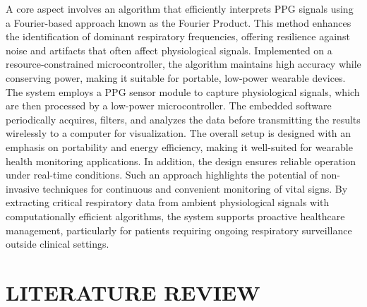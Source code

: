 \documentclass[12pt,a4paper]{report}
\begin{document}
 A core aspect involves an algorithm that efficiently interprets PPG signals using a Fourier-based approach known as the Fourier Product. This method enhances the identification of dominant respiratory frequencies, offering resilience against noise and artifacts that often affect physiological signals. Implemented on a resource-constrained microcontroller, the algorithm maintains high accuracy while conserving power, making it suitable for portable, low-power wearable devices.\\

 The system employs a PPG sensor module to capture physiological signals, which are then processed by a low-power microcontroller. The embedded software periodically acquires, filters, and analyzes the data before transmitting the results wirelessly to a computer for visualization. The overall setup is designed with an emphasis on portability and energy efficiency, making it well-suited for wearable health monitoring applications. In addition, the design ensures reliable operation under real-time conditions. Such an approach highlights the potential of non-invasive techniques for continuous and convenient monitoring of vital signs. By extracting critical respiratory data from ambient physiological signals with computationally efficient algorithms, the system supports proactive healthcare management, particularly for patients requiring ongoing respiratory surveillance outside clinical settings.\\

  
\chapter{\Large{LITERATURE REVIEW}}
\end{document}
